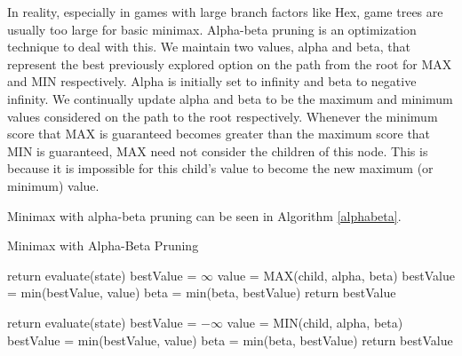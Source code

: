 In reality, especially in games with large branch factors like Hex, game trees are usually too large for basic minimax. Alpha-beta pruning is an optimization technique to deal with this. We maintain two values, alpha and beta, that represent the best previously explored option on the path from the root for MAX and MIN respectively. Alpha is initially set to infinity and beta to negative infinity. We continually update alpha and beta to be the maximum and minimum values considered on the path to the root respectively. Whenever the minimum score that MAX is guaranteed becomes greater than the maximum score that MIN is guaranteed, MAX need not consider the children of this node. This is because it is impossible for this child's value to become the new maximum (or minimum) value.

Minimax with alpha-beta pruning can be seen in Algorithm \ref{alphabeta}.



\begin{algorithm}
    \caption{Minimax with Alpha-Beta Pruning}
    \label{alphabeta}
    \begin{algorithmic}
                \State return evaluate(state)
            \Else 
                \State bestValue = $\infty$
                    \State value = MAX(child, alpha, beta)
                    \State bestValue = min(bestValue, value)
                    \State beta = min(beta, bestValue)
                        \State return bestValue
                    \EndIf
                \EndFor
            \EndIf
        
        \EndProcedure
        
                \State return evaluate(state)
            \Else 
                \State bestValue = $-\infty$
                    \State value = MIN(child, alpha, beta)
                    \State bestValue = min(bestValue, value)
                    \State beta = min(beta, bestValue)
                        \State return bestValue
                    \EndIf
                \EndFor
            \EndIf
        
        \EndProcedure
        
        
    \end{algorithmic}
    
\end{algorithm}



